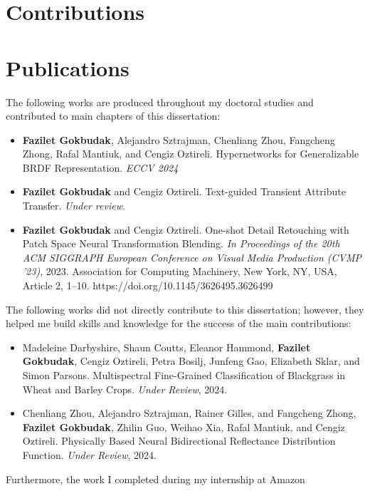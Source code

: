 \section{Contributions}
\section{Publications}

The following works are produced throughout my doctoral studies and contributed to main chapters of this dissertation:

\begin{itemize}

\item \textbf{Fazilet Gokbudak}, Alejandro Sztrajman, Chenliang Zhou,  Fangcheng Zhong, Rafal Mantiuk, and Cengiz Oztireli. Hypernetworks for Generalizable BRDF Representation. \textit{ECCV 2024}

\item \textbf{Fazilet Gokbudak} and Cengiz Oztireli. Text-guided Transient Attribute Transfer. \textit{Under review}.

\item \textbf{Fazilet Gokbudak} and Cengiz Oztireli. One-shot Detail Retouching with Patch Space Neural Transformation Blending. \textit{In Proceedings of the 20th ACM SIGGRAPH European Conference on Visual Media Production (CVMP '23)}, 2023. Association for Computing Machinery, New York, NY, USA, Article 2, 1–10. https://doi.org/10.1145/3626495.3626499

\end{itemize}

The following works did not directly contribute to this dissertation; however, they helped me build skills and knowledge for the success of the main contributions:

\begin{itemize}

\item Madeleine Darbyshire, Shaun Coutts, Eleanor Hammond, \textbf{Fazilet Gokbudak}, Cengiz Oztireli, Petra Bosilj, Junfeng Gao, Elizabeth Sklar, and Simon Parsons. Multispectral Fine-Grained Classification of Blackgrass in Wheat and Barley Crops. \textit{Under Review}, 2024.

\item Chenliang Zhou, Alejandro Sztrajman, Rainer Gilles, and Fangcheng Zhong, \textbf{Fazilet Gokbudak}, Zhilin Guo, Weihao Xia, Rafal Mantiuk, and Cengiz Oztireli. Physically Based Neural Bidirectional Reflectance Distribution Function. \textit{Under Review}, 2024.

\end{itemize}

Furthermore, the work I completed during my internship at Amazon 